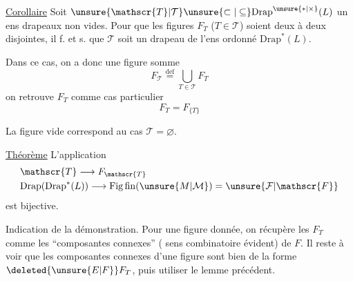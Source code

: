 
\uline{Corollaire} Soit $\unsure{\mathscr{T}|\mathcal{T}}\unsure{\subset|\subseteq}\mathrm{Drap}^{\unsure{*|\times}}(L)$ un ens  drapeaux non vides. Pour que les figures $F_T$ ($T\in\mathscr{T}$) soient deux à deux disjointes, il f. et s. que $\mathscr{T}$ soit un drapeau de l'ens ordonné $\mathrm{Drap}^{*}(L)$.

Dans ce cas, on a donc une figure somme
\[
 F_{\mathscr{T}}\overset{\text{def}}{=}\bigcup_{T\in\mathscr{T}}F_T
\]
on retrouve $F_T$ comme cas particulier
\[
 F_T=F_{\{T\}}
\]

La figure vide correspond au cas $\mathscr{T}=\varnothing$.

\uline{Théorème} L'application
\[
\begin{aligned}
 &\mathscr{T}\longrightarrow F_{\mathscr{T}}\\
 &\mathrm{Drap}(\mathrm{Drap}^{*}(L))\longrightarrow
 \mathrm{Fig}\,\mathrm{fin}(\unsure{M|\mathcal M})=\unsure{\mathcal{F}|\mathscr{F}}
\end{aligned}
\]
est bijective.

Indication de la démonstration. Pour une figure donnée, on récupère les $F_T$ comme les ``composantes connexes'' (  sens combinatoire évident) de $F$. Il  reste à voir que les composantes connexes d'une figure sont bien de la forme $\deleted{\unsure{E|F}}F_T$, puis utiliser le lemme précédent.
